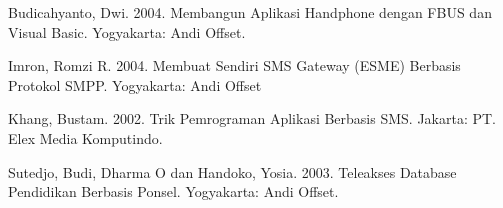 \documentclass{jtetiproposalskripsi}
\begin{document}
\begin{thebibliography}{9}

Budicahyanto, Dwi. 2004. Membangun Aplikasi Handphone dengan FBUS dan
Visual Basic. Yogyakarta: Andi Offset.


Imron, Romzi R. 2004. Membuat Sendiri SMS Gateway (ESME) Berbasis Protokol
SMPP. Yogyakarta: Andi Offset

Khang, Bustam. 2002. Trik Pemrograman Aplikasi Berbasis SMS. Jakarta: PT. Elex
Media Komputindo.

Sutedjo, Budi, Dharma O dan Handoko, Yosia. 2003. Teleakses Database Pendidikan
Berbasis Ponsel. Yogyakarta: Andi Offset.


\end{thebibliography}
\end{document}

